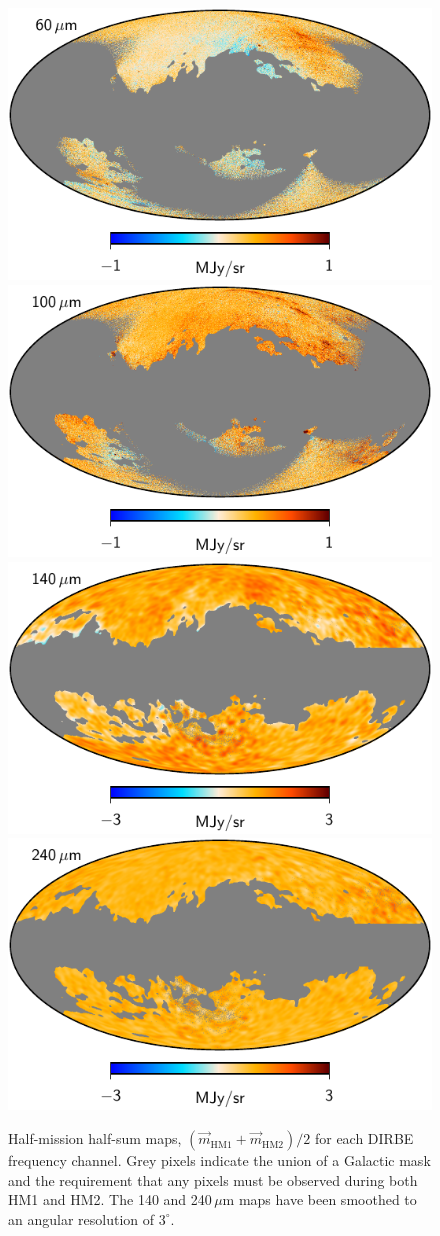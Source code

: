 \documentclass{aa}
\newcommand{\m}[0]{\vec{m}}
\begin{document}
\begin{figure}
  \includegraphics[width=0.42\linewidth]{figs/dirbe_07_hmhs_v1.pdf}\hspace*{5mm}
  \includegraphics[width=0.42\linewidth]{figs/dirbe_08_hmhs_v1.pdf}\\
  \includegraphics[width=0.42\linewidth]{figs/dirbe_09_hmhs_v1_3deg.pdf}\hspace*{5mm}
  \includegraphics[width=0.42\linewidth]{figs/dirbe_10_hmhs_v1_3deg.pdf}
  \caption{Half-mission half-sum maps, $(\m_{\mathrm{HM1}}+\m_{\mathrm{HM2}})/2$ for each DIRBE frequency channel. Grey pixels indicate the union of a Galactic mask and the requirement that any pixels must be observed during both HM1 and HM2. The 140 and 240\,$\mu\mathrm{m}$ maps have been smoothed to an angular resolution of $3^{\circ}$.}
  \label{fig:hmhs}
\end{figure}
\end{document}
